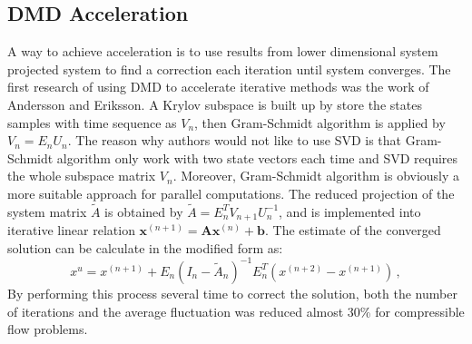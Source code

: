 \subsection{DMD Acceleration}
A way to achieve acceleration is to use results from lower dimensional system projected system to find a correction each iteration until system converges.
The first research of using DMD to accelerate iterative methods was the work of Andersson and Eriksson.\cite{andersson_novel}
A Krylov subspace is built up by store the states samples with time sequence as $V_n$, then Gram-Schmidt algorithm is applied by $V_n = E_n U_n$.
The reason why authors would not like to use SVD is that Gram-Schmidt algorithm only work with two state vectors each time and SVD requires the whole subspace matrix $V_n$. 
Moreover, Gram-Schmidt algorithm is obviously a more suitable approach for parallel computations. 
The reduced projection of the system matrix $\tilde{A}$ is obtained by $\tilde{A} = E_n^T V_{n+1} U_n^{-1}$, and is implemented into iterative linear relation $\mathbf{x}^{(n+1)} = \mathbf{A}\mathbf{x}^{(n)} + \mathbf{b}$.
The estimate of the converged solution can be calculate in the modified form as:
\begin{equation}
 x^{u} = x^{(n+1)} + E_n(I_n - \tilde{A}_n)^{-1} E_n^T(x^{(n+2)} - x^{(n+1)}) \, ,
 \label{eq:andersson}
\end{equation}
By performing this process several time to correct the solution, both the number of iterations and the average fluctuation was reduced almost 30\% for compressible flow problems. 

